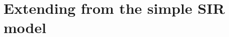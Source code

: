 \documentclass{beamer}
\begin{document}
%
%
%	


\section{Extending from the simple SIR model}
\end{document}
